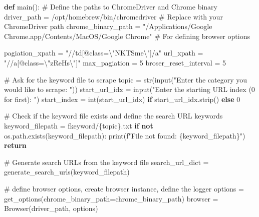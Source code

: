 \documentclass[
  titlepage]{article}
\newenvironment{Shaded}{\begin{snugshade}}{\end{snugshade}}
\newcommand{\BuiltInTok}[1]{\textcolor[rgb]{0.00,0.23,0.31}{#1}}
\newcommand{\CharTok}[1]{\textcolor[rgb]{0.13,0.47,0.30}{#1}}
\newcommand{\CommentTok}[1]{\textcolor[rgb]{0.37,0.37,0.37}{#1}}
\newcommand{\ControlFlowTok}[1]{\textcolor[rgb]{0.00,0.23,0.31}{\textbf{#1}}}
\newcommand{\DecValTok}[1]{\textcolor[rgb]{0.68,0.00,0.00}{#1}}
\newcommand{\KeywordTok}[1]{\textcolor[rgb]{0.00,0.23,0.31}{\textbf{#1}}}
\newcommand{\NormalTok}[1]{\textcolor[rgb]{0.00,0.23,0.31}{#1}}
\newcommand{\OperatorTok}[1]{\textcolor[rgb]{0.37,0.37,0.37}{#1}}
\newcommand{\SpecialCharTok}[1]{\textcolor[rgb]{0.37,0.37,0.37}{#1}}
\newcommand{\SpecialStringTok}[1]{\textcolor[rgb]{0.13,0.47,0.30}{#1}}
\newcommand{\StringTok}[1]{\textcolor[rgb]{0.13,0.47,0.30}{#1}}
\begin{document}
\begin{Shaded}
\begin{Highlighting}[]
\KeywordTok{def}\NormalTok{ main():}
    \CommentTok{\# Define the paths to ChromeDriver and Chrome binary}
\NormalTok{    driver\_path }\OperatorTok{=} \StringTok{\textquotesingle{}/opt/homebrew/bin/chromedriver\textquotesingle{}}  \CommentTok{\# Replace with your ChromeDriver path}
\NormalTok{    chrome\_binary\_path }\OperatorTok{=} \StringTok{"/Applications/Google Chrome.app/Contents/MacOS/Google Chrome"}  \CommentTok{\# For defining browser options}

\NormalTok{    pagiation\_xpath }\OperatorTok{=} \StringTok{"//td[@class=}\CharTok{\textbackslash{}"}\StringTok{NKTSme}\CharTok{\textbackslash{}"}\StringTok{]/a"}
\NormalTok{    url\_xpath }\OperatorTok{=} \StringTok{"//a[@class=}\CharTok{\textbackslash{}"}\StringTok{zReHs}\CharTok{\textbackslash{}"}\StringTok{]"}
\NormalTok{    max\_pagiation }\OperatorTok{=} \DecValTok{5}
\NormalTok{    broser\_reset\_interval }\OperatorTok{=} \DecValTok{5}

    \CommentTok{\# Ask for the keyword file to scrape}
\NormalTok{    topic }\OperatorTok{=} \BuiltInTok{str}\NormalTok{(}\BuiltInTok{input}\NormalTok{(}\StringTok{"Enter the category you would like to scrape: "}\NormalTok{))}
\NormalTok{    start\_url\_idx }\OperatorTok{=} \BuiltInTok{input}\NormalTok{(}\StringTok{"Enter the starting URL index (0 for first): "}\NormalTok{)}
\NormalTok{    start\_index }\OperatorTok{=} \BuiltInTok{int}\NormalTok{(start\_url\_idx) }\ControlFlowTok{if}\NormalTok{ start\_url\_idx.strip() }\ControlFlowTok{else} \DecValTok{0}

    \CommentTok{\# Check if the keyword file exists and define the search URL keywords}
\NormalTok{    keyword\_filepath }\OperatorTok{=} \SpecialStringTok{f\textquotesingle{}keyword/}\SpecialCharTok{\{}\NormalTok{topic}\SpecialCharTok{\}}\SpecialStringTok{.txt\textquotesingle{}}
    \ControlFlowTok{if} \KeywordTok{not}\NormalTok{ os.path.exists(keyword\_filepath):}
        \BuiltInTok{print}\NormalTok{(}\SpecialStringTok{f"File not found: }\SpecialCharTok{\{}\NormalTok{keyword\_filepath}\SpecialCharTok{\}}\SpecialStringTok{"}\NormalTok{)}
        \ControlFlowTok{return}

    \CommentTok{\# Generate search URLs from the keyword file}
\NormalTok{    search\_url\_dict }\OperatorTok{=}\NormalTok{ generate\_search\_urls(keyword\_filepath)}
    
    \CommentTok{\# define browser options, create browser instance, define the logger}
\NormalTok{    options }\OperatorTok{=}\NormalTok{ get\_options(chrome\_binary\_path}\OperatorTok{=}\NormalTok{chrome\_binary\_path)}
\NormalTok{    browser }\OperatorTok{=}\NormalTok{ Browser(driver\_path, options)}


\end{Highlighting}
\end{Shaded}
\end{document}
